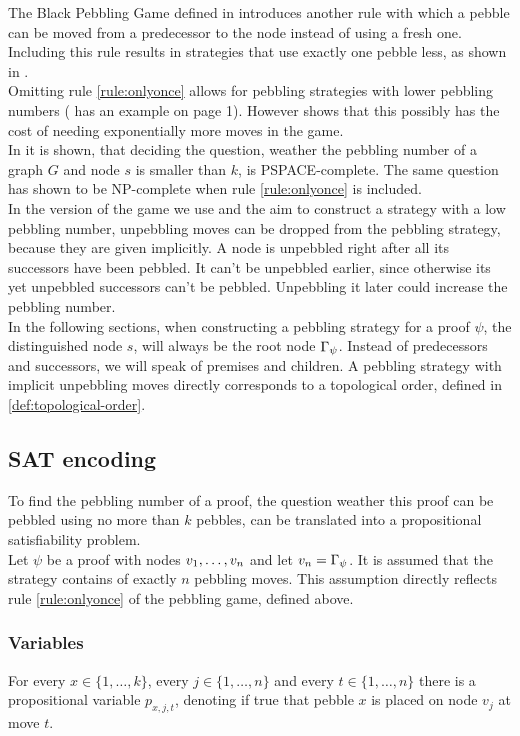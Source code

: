 \documentclass{llncs}
\begin{document}
The Black Pebbling Game defined in \cite{hertel2007black,pippenger1982advances} introduces another rule with which a pebble can be moved from a predecessor to the node instead of using a fresh one.
Including this rule results in strategies that use exactly one pebble less, as shown in \cite{van1979move}.\\
Omitting rule \ref{rule:onlyonce} allows for pebbling strategies with lower pebbling numbers (\cite{sethi1975complete} has an example on page 1).
However \cite{van1979move} shows that this possibly has the cost of needing exponentially more moves in the game.\\
In \cite{gilbert1980pebbling} it is shown, that deciding the question, weather the pebbling number of a graph $G$ and node $s$ is smaller than $k$, is PSPACE-complete. 
The same question has shown to be NP-complete \cite{sethi1975complete} when rule \ref{rule:onlyonce} is included.\\ %
In the version of the game we use and the aim to construct a strategy with a low pebbling number, unpebbling moves can be dropped from the pebbling strategy, because they are given implicitly. 
A node is unpebbled right after all its successors have been pebbled. 
It can't be unpebbled earlier, since otherwise its yet unpebbled successors can't be pebbled. 
Unpebbling it later could increase the pebbling number.\\
In the following sections, when constructing a pebbling strategy for a proof $\psi$, the distinguished node $s$, will always be the root node $\Gamma_{\psi}$. Instead of predecessors and successors, we will speak of premises and children.
A pebbling strategy with implicit unpebbling moves directly corresponds to a topological order, defined in \ref{def:topological-order}.

\subsection{SAT encoding}

To find the pebbling number of a proof, the question weather this proof can be pebbled using no more than $k$ pebbles, can be translated into a propositional satisfiability problem.\\
Let $\psi$ be a proof with nodes $v_1,\ldots,v_n$ and let $v_n = \Gamma_{\psi}$. It is assumed that the strategy contains of exactly $n$ pebbling moves.
This assumption directly reflects rule \ref{rule:onlyonce} of the pebbling game, defined above.
\subsubsection*{Variables}
For every $x \in \{1,\ldots,k\}$, every $j \in \{1,\ldots,n\}$ and every $t \in \{1,\ldots,n\}$ there is a propositional variable $p_{x,j,t}$, denoting if true that pebble $x$ is placed on node $v_j$ at move $t$.
\end{document}
